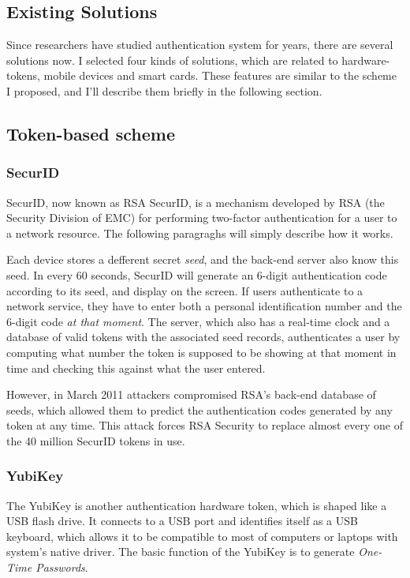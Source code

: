\begin{CJK}{Bg5}{bsmi}
\section{Existing Solutions}
\label{sec:related-work}

Since researchers have studied authentication system for years, there are several solutions now. I selected four kinds of solutions, which are related to hardware-tokens, mobile devices and smart cards. These features are similar to the scheme I proposed, and I'll describe them briefly in the following section.

\subsection{Token-based scheme}

\subsubsection{SecurID}

SecurID, now known as RSA SecurID\cite{rsa-securid}, is a mechanism developed by RSA (the Security Division of EMC) for performing two-factor authentication for a user to a network resource. The following paragraghs will simply describe how it works.

Each device stores a defferent secret \emph{seed}, and the back-end server also know this seed. In every 60 seconds, SecurID will generate an 6-digit authentication code according to its seed, and display on the screen. If users authenticate to a network service, they have to enter both a personal identification number and the 6-digit code \emph{at that moment}. The server, which also has a real-time clock and a database of valid tokens with the associated seed records, authenticates a user by computing what number the token is supposed to be showing at that moment in time and checking this against what the user entered.

However, in March 2011 attackers compromised RSA's back-end database of seeds\cite{rsa-hack}, which allowed them to predict the authentication codes generated by any token at any time. This attack forces RSA Security to replace almost every one of the 40 million SecurID tokens in use.

\subsubsection{YubiKey}

The YubiKey\cite{yubikey} is another authentication hardware token, which is shaped like a USB flash drive. It connects to a USB port and identifies itself as a USB keyboard, which allows it to be compatible to most of computers or laptops with system's native driver. The basic function of the YubiKey is to generate \emph{One-Time Passwords}. 


\end{CJK}
